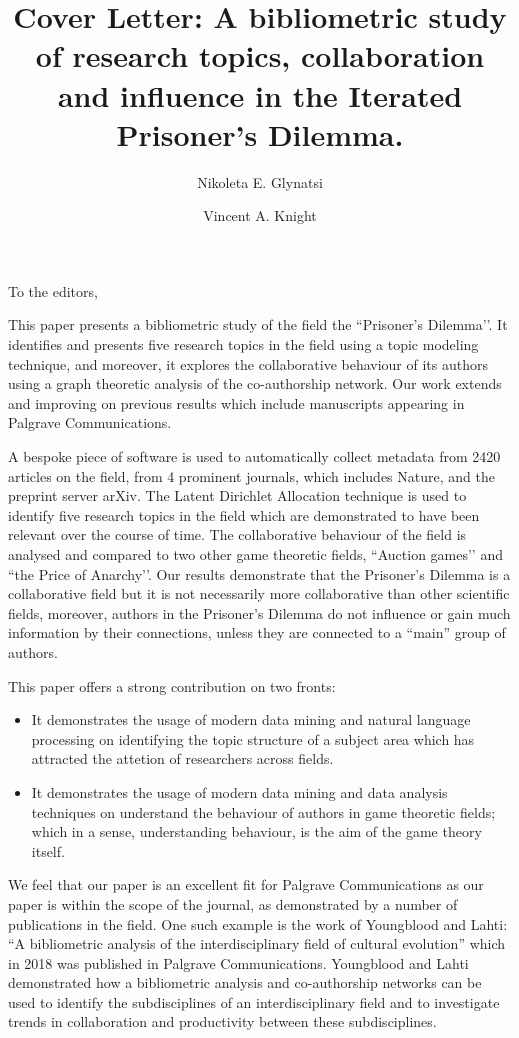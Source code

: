 \documentclass{article}
\title{Cover Letter: A bibliometric study of research topics, collaboration and
influence in the Iterated Prisoner’s Dilemma.}
\author[1]{Nikoleta E. Glynatsi}
\author[1]{Vincent A. Knight}
\affil[1]{Cardiff University, School of Mathematics, Cardiff, United Kingdom}
\date{}
\begin{document}
\maketitle

To the editors,

This paper presents a bibliometric study of the field the ``Prisoner’s
Dilemma’’. It identifies and presents five research topics in the field using a
topic modeling technique, and moreover, it explores the collaborative behaviour
of its authors using a graph theoretic analysis of the co-authorship network.
Our work extends and improving on previous results which include
manuscripts appearing in Palgrave Communications.

A bespoke piece of software is used to automatically collect metadata from 2420
articles on the field, from 4 prominent journals, which includes Nature, and the
preprint server arXiv. The Latent Dirichlet Allocation technique is used to
identify five research topics in the field which are demonstrated to have been
relevant over the course of time. The collaborative behaviour of the field is
analysed and compared to two other game theoretic fields, ``Auction games’’ and
``the Price of Anarchy’’. Our results demonstrate that the Prisoner's Dilemma is
a collaborative field but it is not necessarily more collaborative than other
scientific fields, moreover, authors in the Prisoner’s Dilemma do not influence
or gain much information by their connections, unless they are connected to a
``main” group of authors.

This paper offers a strong contribution on two fronts:

\begin{itemize}
    \item It demonstrates the usage of modern data mining and natural language
    processing on identifying the topic structure of a subject area which has
    attracted the attetion of researchers across fields.
    \item It demonstrates the usage of modern data mining and data analysis
    techniques on understand the behaviour of authors in game theoretic
    fields; which in a sense, understanding behaviour, is the aim of the game
    theory itself.
\end{itemize}

We feel that our paper is an excellent fit for Palgrave Communications as our
paper is within the scope of the journal, as demonstrated by a number of
publications in the field. One such example is the work of Youngblood and Lahti:
``A bibliometric analysis of the interdisciplinary field of cultural evolution''
which in 2018 was published in Palgrave Communications. Youngblood and Lahti
demonstrated how a bibliometric analysis and co-authorship networks can be
used to identify the subdisciplines of an interdisciplinary field and to
investigate trends in collaboration and productivity between these subdisciplines.
\end{document}
